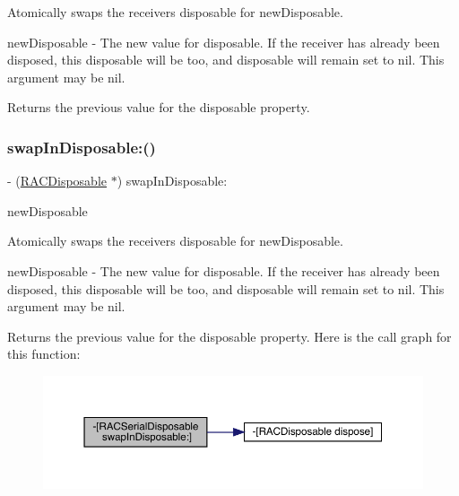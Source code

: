 Atomically swaps the receiver\textquotesingle{}s {\ttfamily disposable} for {\ttfamily new\+Disposable}.

new\+Disposable -\/ The new value for {\ttfamily disposable}. If the receiver has already been disposed, this disposable will be too, and {\ttfamily disposable} will remain set to nil. This argument may be nil.

Returns the previous value for the {\ttfamily disposable} property. \mbox{\label{interface_r_a_c_serial_disposable_ad850b6d2134907b94937832f1aea2d20}} 
\subsubsection{\texorpdfstring{swap\+In\+Disposable\+:()}{swapInDisposable:()}\hspace{0.1cm}{\footnotesize\ttfamily [2/3]}}
{\footnotesize\ttfamily -\/ (\mbox{\hyperlink{interface_r_a_c_disposable}{R\+A\+C\+Disposable}} $\ast$) swap\+In\+Disposable\+: \begin{DoxyParamCaption}\item[{(\mbox{\hyperlink{interface_r_a_c_disposable}{R\+A\+C\+Disposable}} $\ast$)}]{new\+Disposable }\end{DoxyParamCaption}}

Atomically swaps the receiver\textquotesingle{}s {\ttfamily disposable} for {\ttfamily new\+Disposable}.

new\+Disposable -\/ The new value for {\ttfamily disposable}. If the receiver has already been disposed, this disposable will be too, and {\ttfamily disposable} will remain set to nil. This argument may be nil.

Returns the previous value for the {\ttfamily disposable} property. Here is the call graph for this function\+:\nopagebreak
\begin{figure}[H]
\begin{center}
\leavevmode
\includegraphics[width=350pt]{interface_r_a_c_serial_disposable_ad850b6d2134907b94937832f1aea2d20_cgraph}
\end{center}
\end{figure}
\mbox{\label{interface_r_a_c_serial_disposable_ad850b6d2134907b94937832f1aea2d20}} 
